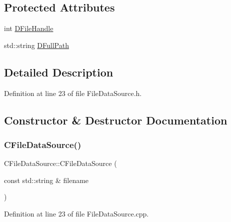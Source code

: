 \subsection*{Protected Attributes}
\begin{DoxyCompactItemize}
\item 
int \hyperlink{classCFileDataSource_abad036de6dfe018ddc6160a2026a401d}{D\+File\+Handle}
\item 
std\+::string \hyperlink{classCFileDataSource_acf4e0d3f7c32cae09f91b7530e490aea}{D\+Full\+Path}
\end{DoxyCompactItemize}


\subsection{Detailed Description}


Definition at line 23 of file File\+Data\+Source.\+h.



\subsection{Constructor \& Destructor Documentation}
\hypertarget{classCFileDataSource_a785000233dad6de4fe5f5986639642b3}{}\label{classCFileDataSource_a785000233dad6de4fe5f5986639642b3} 
\subsubsection{\texorpdfstring{C\+File\+Data\+Source()}{CFileDataSource()}}
{\footnotesize\ttfamily C\+File\+Data\+Source\+::\+C\+File\+Data\+Source (\begin{DoxyParamCaption}\item[{const std\+::string \&}]{filename }\end{DoxyParamCaption})}



Definition at line 23 of file File\+Data\+Source.\+cpp.


